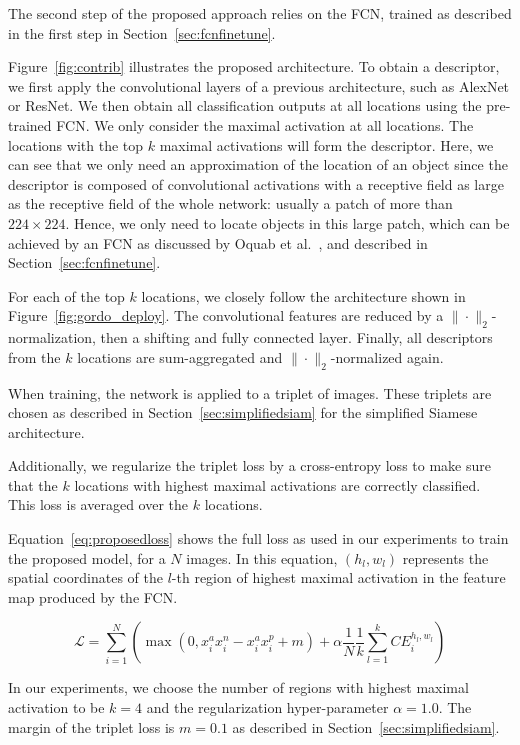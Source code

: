 The second step of the proposed approach relies on the FCN, trained
as described in the first step in Section~\ref{sec:fcnfinetune}.

Figure~\ref{fig:contrib} illustrates the proposed architecture.
To obtain a descriptor, we first apply the convolutional layers of
a previous architecture, such as AlexNet or ResNet. We then obtain all
classification outputs at all locations using the pre-trained FCN.
We only consider the maximal activation at all locations.
The locations with the top $k$ maximal activations will form the descriptor.
Here, we can see that we only need an approximation of the location of
an object since the descriptor is composed of convolutional activations with a
receptive field as large as the receptive field of the whole network: usually
a patch of more than $224 \times 224$. Hence, we only need to locate objects
in this large patch, which can be achieved by an FCN as discussed by Oquab
et al.~\cite{oquab_is_2015}, and described in Section~\ref{sec:fcnfinetune}.

For each of the top $k$ locations, we closely follow the architecture
shown in
Figure~\ref{fig:gordo_deploy}. The convolutional features are
reduced by a $\|\cdot\|_2$-normalization, then a shifting and fully connected
layer. Finally, all descriptors from the $k$ locations are
sum-aggregated and $\|\cdot\|_2$-normalized again.

When training, the network is applied to a triplet of images.
These triplets are chosen as described in Section~\ref{sec:simplifiedsiam}
for the simplified Siamese architecture.

Additionally, we regularize the triplet loss by a cross-entropy loss
to make sure that the $k$ locations with highest
maximal activations are correctly classified. This loss is averaged over
the $k$ locations.

Equation~\ref{eq:proposedloss} shows the full loss as used in our
experiments to train the proposed model, for a $N$ images. In this
equation, $(h_l, w_l)$ represents the spatial coordinates of the $l$-th
region of highest maximal activation in the feature map produced by
the FCN.

\begin{equation}\label{eq:proposedloss}
\mathcal{L} = \sum_{i=1}^N \left( \max(0, x^a_i x^n_i - x^a_i x^p_i + m) +
\alpha \frac{1}{N} \frac{1}{k} \sum_{l=1}^k \mathit{CE}_i^{h_l,w_l} \right)
\end{equation}

In our experiments, we choose the number of regions with highest maximal
activation to be $k=4$ and the regularization hyper-parameter $\alpha=1.0$.
The margin of the triplet loss is $m=0.1$ as described in
Section~\ref{sec:simplifiedsiam}.

